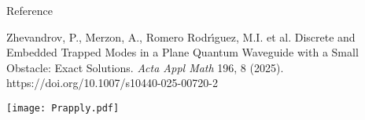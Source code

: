 \documentclass{beamer}
\begin{document}
\begin{frame}{Reference}

Zhevandrov, P., Merzon, A., Romero Rodr\'\i guez, M.I. et al. Discrete and Embedded Trapped Modes in a Plane Quantum Waveguide with a Small Obstacle: Exact Solutions. {\it Acta Appl Math} 196, 8 (2025). https://doi.org/10.1007/s10440-025-00720-2


















\end{frame}
\begin{frame}


    \texttt{[image: Prapply.pdf]}

\end{frame}
\end{document}
